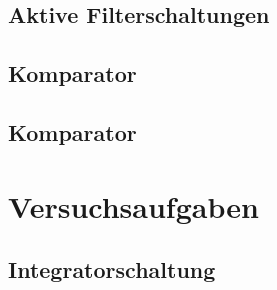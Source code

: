 \documentclass[a4paper, 12pt]{article}
\begin{document}
\subsection{Aktive Filterschaltungen}


\subsection{Komparator}


\subsection{Komparator}
%

  
  \clearpage
  \setcounter{page}{1}
  \setcounter{figure}{0}


  \section{Versuchsaufgaben}
  
  \subsection{Integratorschaltung}
  
\end{document}
